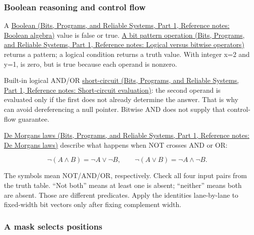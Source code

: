 \subsubsection{Boolean reasoning and control flow}\label{05-engine-i-ch001-boolean-reasoning-and-control-flow}

\hypertarget{05-engine-i-ch001-boolean-reasoning-and-control-flow}{}

A \href{../01-Bits-Programs-and-Reliable-Systems-P01/main.pdf\#appendix-24475e1596a8}{Boolean (Bits, Programs, and Reliable Systems, Part 1, Reference notes: Boolean algebra)} value is false or true. \href{../01-Bits-Programs-and-Reliable-Systems-P01/main.pdf\#appendix-fe6b457d68d8}{A bit pattern operation (Bits, Programs, and Reliable Systems, Part 1, Reference notes: Logical versus bitwise operators)} returns a pattern; a logical condition returns a truth value. With integer x=2 and y=1,  is zero, but  is true because each operand is nonzero.

Built-in logical AND/OR \href{../01-Bits-Programs-and-Reliable-Systems-P01/main.pdf\#appendix-2e245a6fa8d3}{short-circuit (Bits, Programs, and Reliable Systems, Part 1, Reference notes: Short-circuit evaluation)}: the second operand is evaluated only if the first does not already determine the answer. That is why  can avoid dereferencing a null pointer. Bitwise AND does not supply that control-flow guarantee.

\href{../01-Bits-Programs-and-Reliable-Systems-P01/main.pdf\#appendix-9079d3659da4}{De Morgan\textquotesingle s laws (Bits, Programs, and Reliable Systems, Part 1, Reference notes: De Morgan\textquotesingle s laws)} describe what happens when NOT crosses AND or OR:

\[
\neg(A\land B)=\neg A\lor\neg B,\qquad
\neg(A\lor B)=\neg A\land\neg B.
\]

The symbols mean NOT/AND/OR, respectively. Check all four input pairs from the truth table. ``Not both'' means at least one is absent; ``neither'' means both are absent. Those are different predicates. Apply the identities lane-by-lane to fixed-width bit vectors only after fixing complement width.

\subsubsection{A mask selects positions}\label{05-engine-i-ch001-a-mask-selects-positions}

